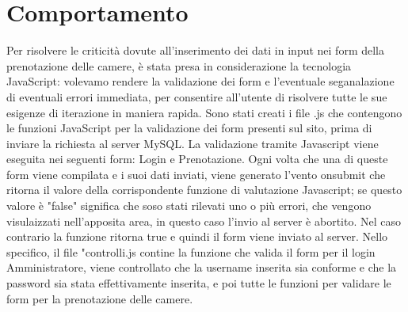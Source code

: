 \section{Comportamento} %
Per risolvere le criticità dovute all'inserimento dei dati in input nei form della prenotazione delle camere, è stata presa in considerazione la tecnologia JavaScript: volevamo rendere la validazione dei form e l'eventuale seganalazione di eventuali errori immediata, per consentire all'utente di risolvere tutte le sue esigenze di iterazione in maniera rapida.
Sono stati creati i file .js che contengono le funzioni JavaScript per la validazione dei form presenti sul sito, prima di inviare la richiesta al server MySQL. La validazione tramite Javascript viene eseguita nei seguenti form: Login e Prenotazione. Ogni volta che una di queste form viene compilata e i suoi dati inviati, viene generato l'vento onsubmit che ritorna il valore della corrispondente funzione di valutazione Javascript; se questo valore è "false" significa che soso stati rilevati uno o più errori, che vengono visulaizzati nell'apposita area, in questo caso l'invio al server è abortito. Nel caso contrario la funzione ritorna true e quindi il form viene inviato al server.
Nello specifico, il file "controlli.js	contine la funzione che valida il form per il login Amministratore, viene controllato che la username inserita sia conforme e che la password sia stata effettivamente inserita, e poi tutte le funzioni per validare le form per la prenotazione delle camere.